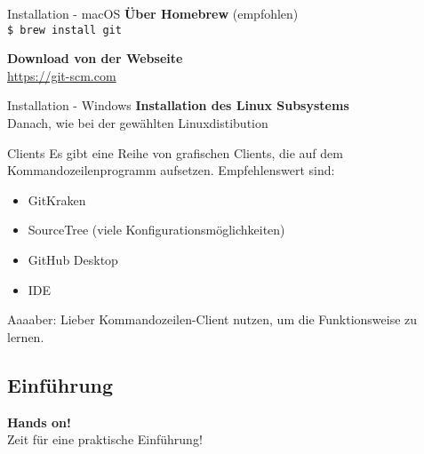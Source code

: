 \begin{frame}{Installation - macOS}
	\centering
	\textbf{Über Homebrew} (empfohlen)\\
	\texttt{\$ brew install git}

	\vfill

	\textbf{Download von der Webseite} \\
	\url{https://git-scm.com}
\end{frame}

\begin{frame}{Installation - Windows}
	\centering
	\textbf{Installation des Linux Subsystems} \\
	Danach, wie bei der gewählten Linuxdistibution
\end{frame}


\begin{frame}{Clients}
	Es gibt eine Reihe von grafischen Clients, die auf dem Kommandozeilenprogramm aufsetzen.
	Empfehlenswert sind:
	\begin{itemize}
		\item GitKraken
		\item SourceTree (viele Konfigurationsmöglichkeiten)
		\item GitHub Desktop
		\item IDE 
	\end{itemize}

	\vfill
	\alert{Aaaaber:} Lieber Kommandozeilen-Client nutzen, um die Funktionsweise zu lernen.
\end{frame}


\subsection{Einführung}
\begin{frame}
	\centering \Huge \textbf{Hands on!} \\[.7cm]
	\normalsize Zeit für eine praktische Einführung!
\end{frame}

